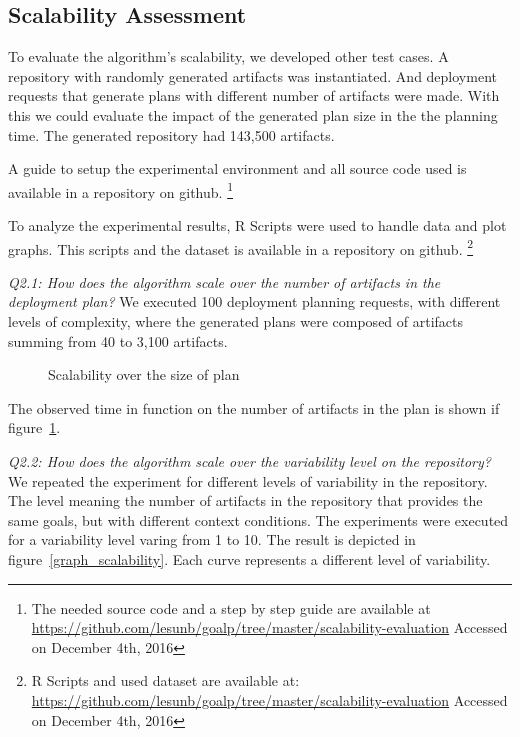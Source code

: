 \subsection{Scalability Assessment}

To evaluate the algorithm's scalability, we developed other test cases.  A repository with randomly generated artifacts was instantiated. And deployment requests that generate plans with different number of artifacts were made. With this we could evaluate the impact of the generated plan size in the the planning time.
The generated repository had 143,500 artifacts.

A guide to setup the experimental environment and all source code used is available in a repository on github.
\footnote{The needed source code and a step by step guide are available at
\url{https://github.com/lesunb/goalp/tree/master/scalability-evaluation} Accessed on December 4th, 2016}

To analyze the experimental results, R Scripts\cite{the_r_foundation_r_2016} were used to handle data and plot graphs. This scripts and the dataset is available in a repository on github.
\footnote{R Scripts and used dataset are available at:
\url{https://github.com/lesunb/goalp/tree/master/scalability-evaluation} Accessed on December 4th, 2016}

\emph{Q2.1: How does the algorithm scale over the number of artifacts in the deployment plan?} We executed 100 deployment planning requests, with different levels of complexity, where the generated plans were composed of artifacts summing from 40 to 3,100 artifacts.

\begin{figure}[!htb]
  \centering
  \caption{Scalability over the size of plan}
\label{graph_plan_size_and_time}
\end{figure}

The observed time in function on the number of artifacts in the plan is shown if figure~\ref{graph_plan_size_and_time}.

\emph{Q2.2:  How does the algorithm scale over the variability level on the repository?} We repeated the experiment for different levels of variability in the repository.
The level meaning the number of artifacts in the repository that provides the same goals, but with different context conditions. The experiments were executed for a variability level varing from 1 to 10.
The result is depicted in figure~\ref{graph_scalability}. Each curve represents a different level of variability.

